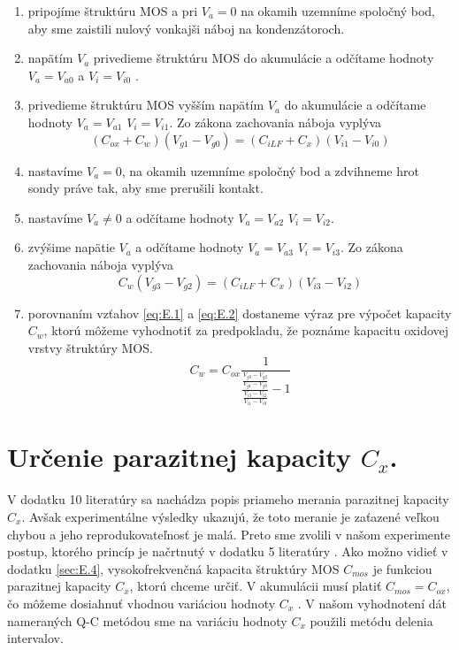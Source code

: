 \begin{enumerate}
\item pripojíme štruktúru MOS a pri $V_a = 0$ na okamih uzemníme
  spoločný bod, aby sme zaistili nulový vonkajši náboj na
  kondenzátoroch.
\item napätím $V_a$ privedieme štruktúru MOS do akumulácie a
  odčítame hodnoty $V_a = V_{a0}$ a $V_i = V_{i0}$ .
\item privedieme štruktúru MOS vyšším napätím $V_a$ do akumulácie a
  odčítame hodnoty $V_a = V_{a1}$ $V_i = V_{i1}$. Zo zákona zachovania
  náboja vyplýva
\begin{equation}\label{eq:E.1}
(C_{ox} + C_w)(V_{g1} - V_{g0}) = (C_{iLF} + C_x)(V_{i1} - V_{i0})
\end{equation}
\item nastavíme $V_a=0$, na okamih uzemníme spoločný bod a zdvihneme
  hrot sondy práve tak, aby sme prerušili kontakt.
\item nastavíme $V_a \neq 0$ a odčítame hodnoty $V_a = V_{a2}$ $V_i =
  V_{i2}$.
\item zvýšime napätie $V_a$ a odčítame hodnoty $V_a = V_{a3}$ $V_i =
  V_{i3}$. Zo zákona zachovania náboja vyplýva
\begin{equation}\label{eq:E.2}
C_w (V_{g3} - V_{g2}) = (C_{iLF} + C_x)(V_{i3} - V_{i2})
\end{equation}
\item porovnaním vzťahov \ref{eq:E.1} a \ref{eq:E.2} dostaneme výraz
  pre výpočet kapacity $C_w$, ktorú môžeme vyhodnotiť za predpokladu,
  že poznáme kapacitu oxidovej vrstvy štruktúry MOS.
\begin{equation}\label{eq:E.3}
C_w = C_{ox} \frac{1} {\frac {\frac{V_{g3}-V_{g2}}{V_{g1}-V_{g0}}} {\frac{V_{i3}-V_{i2}}{V_{i1}-V_{i0}}} -1}
\end{equation}
\end{enumerate}


\section{Určenie parazitnej kapacity $C_x$.}\label{sec:E.2}

V dodatku 10 literatúry \cite{App.4} sa nachádza popis priameho
merania parazitnej kapacity $C_x$.  Avšak experimentálne výsledky
ukazujú, že toto meranie je zaťazené veľkou chybou a jeho
reprodukovateľnosť je malá. Preto sme zvolili v našom experimente
postup, ktorého princíp je načrtnutý v dodatku 5 literatúry
\cite{App.4}. Ako možno vidieť v dodatku \ref{sec:E.4},
vysokofrekvenčná kapacita štruktúry MOS $C_{mos}$ je funkciou
parazitnej kapacity $C_x$, ktorú chceme určiť. V akumulácii musí
platiť $C_{mos} = C_{ox}$, čo môžeme dosiahnuť vhodnou variáciou
hodnoty $C_x$ . V našom vyhodnotení dát nameraných Q-C metódou sme na
variáciu hodnoty $C_x$ použili metódu delenia intervalov.


